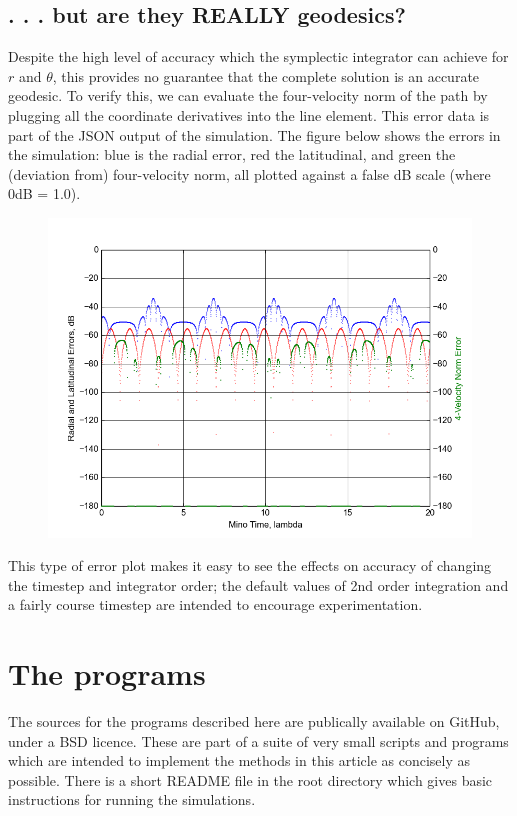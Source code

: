 \documentclass[11pt]{article}
\begin{document}
\subsection{. . . but are they REALLY geodesics?}

Despite the high level of accuracy which the symplectic integrator can achieve for $r$ and $\theta$, this provides no guarantee that the complete solution is an accurate geodesic.  To verify this, we can evaluate the four-velocity norm of the path by plugging all the coordinate derivatives into the line element.  This error data is part of the JSON output of the simulation.  The figure below shows the errors in the simulation: blue is the radial error, red the latitudinal, and green the (deviation from) four-velocity norm, all plotted against a false dB scale (where 0dB = 1.0).
\begin{figure}[h]
\includegraphics[width=\textwidth]{figure_1}
\end{figure}
This type of error plot makes it easy to see the effects on accuracy of changing the timestep and integrator order; the default values of 2nd order integration and a fairly course timestep are intended to encourage experimentation.

\section{The programs}

The sources for the programs \cite{m4r35n357} described here are publically available on GitHub, under a BSD licence.  These are part of a suite of very small scripts and programs which are intended to implement the methods in this article as concisely as possible.  There is a short README file in the root directory which gives basic instructions for running the simulations.
\end{document}
